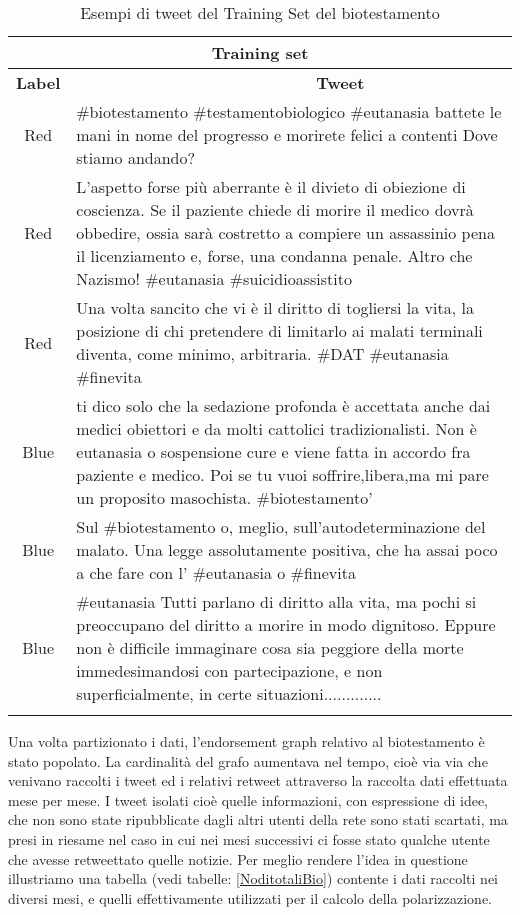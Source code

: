 \begin{longtable}[c]{|c|p{10cm}|}

 \hline
 \multicolumn{2}{|c|}{\textbf{Training set}} \\
 \hline 
 
 \textbf{Label} & \ \ \ \ \ \ \ \ \ \ \ \ \ \ \ \ \ \ \ \ \ \ \ \ \ \ \ \ \ \ \textbf{Tweet}\\
 \hline
 Red   & \#biotestamento \#testamentobiologico \#eutanasia battete le mani in nome del progresso e morirete felici a contenti Dove stiamo andando?\\ \hline
 Red & L'aspetto forse più aberrante è il divieto di obiezione di coscienza. Se il paziente chiede di morire il medico dovrà obbedire, ossia sarà costretto a compiere un assassinio pena il licenziamento e, forse, una condanna penale. Altro che Nazismo! \#eutanasia \#suicidioassistito \\ \hline
 Red & Una volta sancito che vi è il diritto di togliersi la vita, la posizione di chi pretendere di limitarlo ai malati terminali diventa, come minimo, arbitraria. \#DAT \#eutanasia \#finevita \\ \hline 
 Blue & ti dico solo che la sedazione profonda è accettata anche dai medici obiettori e da molti cattolici tradizionalisti. Non è eutanasia o sospensione cure e viene fatta in accordo fra paziente e medico. Poi se tu vuoi soffrire,libera,ma mi pare un proposito masochista. \#biotestamento'  \\ \hline
Blue & Sul \#biotestamento o, meglio, sull'autodeterminazione del malato. Una legge assolutamente positiva, che ha assai poco a che fare con l' \#eutanasia o \#finevita \\ \hline
Blue & \#eutanasia Tutti parlano di diritto alla vita, ma pochi si preoccupano del diritto a morire in modo dignitoso. Eppure non è difficile immaginare cosa sia peggiore della morte immedesimandosi con partecipazione, e non superficialmente, in certe situazioni.............\\
 \hline
\caption{Esempi di tweet del Training Set del biotestamento}
 \label{trainingSetExampleBio}
\end{longtable}

Una volta partizionato i dati, l'endorsement graph relativo al biotestamento è stato popolato. La cardinalità del grafo aumentava nel tempo, cioè via via che venivano raccolti i tweet ed i relativi retweet attraverso la raccolta dati effettuata mese per mese. I tweet isolati cioè quelle informazioni, con espressione di idee, che non sono state ripubblicate dagli altri utenti della rete sono stati scartati, ma presi in riesame nel caso in cui nei mesi successivi ci fosse stato qualche utente che avesse retweettato quelle notizie.
Per meglio rendere l'idea in questione illustriamo una tabella (vedi tabelle: \ref{NoditotaliBio}) contente i dati raccolti nei diversi mesi, e quelli effettivamente utilizzati per il calcolo della polarizzazione.

